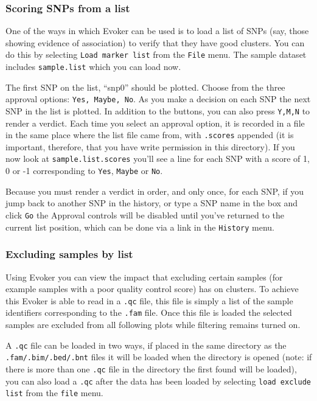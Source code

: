 \documentclass{article}
\begin{document}
\subsubsection{Scoring SNPs from a list}

One of the ways in which Evoker can be used is to load a list of SNPs (say, those showing evidence of association) to verify that they have good clusters. You can do this by selecting \texttt{Load marker list} from the \texttt{File} menu. The sample dataset includes \texttt{sample.list} which you can load now.

The first SNP on the list, ``snp0'' should be plotted. Choose from the three approval options: \texttt{Yes, Maybe, No}. As you make a decision on each SNP the next SNP in the list is plotted. In addition to the buttons, you can also press \texttt{Y,M,N} to render a verdict. Each time you select an approval option, it is recorded in a file in the same place where the list file came from, with \texttt{.scores} appended (it is important, therefore, that you have write permission in this directory). If you now look at \texttt{sample.list.scores} you'll see a line for each SNP with a score of 1, 0 or -1 corresponding to \texttt{Yes}, \texttt{Maybe} or \texttt{No}. 

Because you must render a verdict in order, and only once, for each SNP, if you jump back to another SNP in the history, or type a SNP name in the box and click \texttt{Go} the Approval controls will be disabled until you've returned to the current list position, which can be done via a link in the \texttt{History} menu.

\subsubsection{Excluding samples by list}
Using Evoker you can view the impact that excluding certain samples (for example samples with a poor quality control score) has on clusters. To achieve this Evoker is able to read in a \texttt{.qc} file, this file is simply a list of the sample identifiers corresponding to the \texttt{.fam} file. Once this file is loaded the selected samples are excluded from all following plots while filtering remains turned on.

A \texttt{.qc}  file can be loaded in two ways, if placed in the same directory as the \texttt{.fam/.bim/.bed/.bnt} files it will be loaded when the directory is opened  (note: if there is more than one \texttt{.qc} file in the directory the first found will be loaded), you can also load a  \texttt{.qc} after the data has been loaded by selecting \texttt{load exclude list} from the \texttt{file} menu. 
\end{document}

